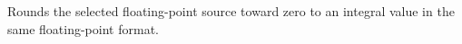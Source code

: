 Rounds the selected floating-point source toward zero to an integral value in the same floating-point format.
